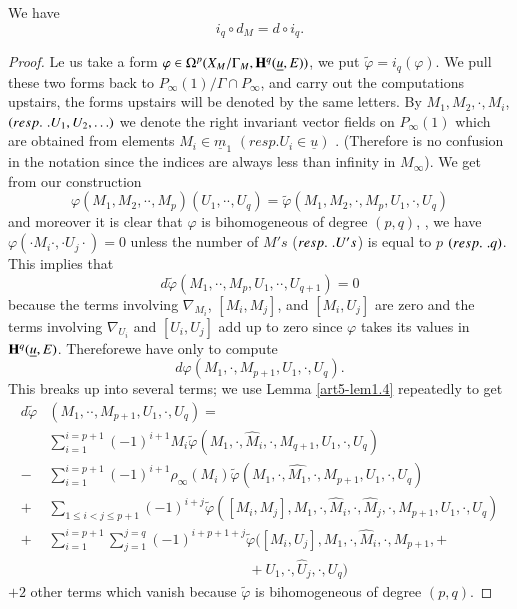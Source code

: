 \setcounter{equation}{5}
\begin{lemma}\label{art5-lem2.6}
We have 
$$
i_q \circ d_M = d \circ i_q.
$$
\end{lemma}

\begin{proof}
Le us take a form $\varphi \in \Omega^p (X_M / \Gamma_M, \mathbf{H}^q (\underline{u}, E))$, we put $\tilde{\varphi}= i_q (\varphi)$. We pull these two forms back to $P_\infty (1)/ \Gamma \cap P_\infty$, and  carry out the computations upstairs, the forms upstairs will be denoted by the same letters. By $M_1, M_2, \cdot, M_i$, $({resp.}\kern.3em. U_1, U_2, \ldots)$ we denote the right invariant vector fields on $P_\infty(1)$ which are obtained from elements $M_i \in \underline{m}_1$ $(resp. U_i \in \underline{u})$ . (Therefore is no confusion in the notation since the indices are always less than infinity in $M_\infty$). We get from our construction
$$
\varphi (M_1, M_2, \cdot \cdot , M_p) (U_1, \cdot \cdot , U_q) = \tilde{\varphi} (M_1, M_2, \cdot , M_p, U_1, \cdot, U_q)
$$
and moreover it is clear that $\varphi$ is bihomogeneous of degree $(p,q)$, \ie, we have $\varphi (\cdot M_i \cdot , \cdot U_j \cdot) = 0$ unless the number of $M's$ (${resp.}\kern.3em. U's$) is equal to $p$ $({resp.}\kern.3em. q)$. This implies that
$$
d \tilde{\varphi} (M_1, \cdot \cdot , M_p, U_1, \cdot \cdot, U_{q+1}) = 0
$$
because the terms involving $\nabla_{M_i}$, $[M_i, M_j]$, and $[M_i, U_j]$ are zero and the terms involving $\nabla_{U_i}$ and $[U_i, U_j]$ add up to zero since $\varphi$ takes its values in $\mathbf{H}^q (\underline{u}, E)$. Therefore\pageoriginale  we have only to compute 
$$
d \varphi (M_1, \cdot , M_{p+1} , U_1, \cdot , U_q).
$$
 This breaks up into several terms; we use Lemma \ref{art5-lem1.4} repeatedly to get 
\begin{align*}
d\tilde{\varphi}& (M_1, \cdot \cdot , M_{p+1}, U_1, \cdot, U_q) =\\
& \sum\limits^{i=p+1}_{i=1} (-1)^{i+1} M_i \tilde{\varphi} (M_1, \cdot , \hat{M}_i, \cdot, M_{q+1}, U_1, \cdot , U_q) \tag{I}\\
- & \sum\limits^{i=p+1}_{i=1} (-1)^{i+1} \rho_\infty (M_i) \tilde{\varphi} (M_1, \cdot , \hat{M_1}, \cdot, M_{p+1}, U_1, \cdot , U_q) \tag{II}\\
+ & \sum\limits_{1 \leqslant i < j \leqslant p +1} (-1)^{i+j} \tilde{\varphi} ([M_i, M_j], M_1, \cdot , \hat{M}_i, \cdot , \hat{M}_j, \cdot , M_{p+1}, U_1, \cdot , U_q) \tag{III}\\
+ & \sum\limits^{i=p+1}_{i=1} \sum\limits^{j=q}_{j=1} (-1)^{i+p+1+j} \tilde{\varphi} ([M_i, U_j], M_1, \cdot , \hat{M}_i , \cdot, M_{p+1}, +\\
& \hspace{6cm}+ U_1, \cdot, \hat{U}_j, \cdot , U_q) \tag{IV}
\end{align*}
$+2$ other terms which vanish because $\tilde{\varphi}$ is bihomogeneous of degree $(p,q)$.


\end{proof}
